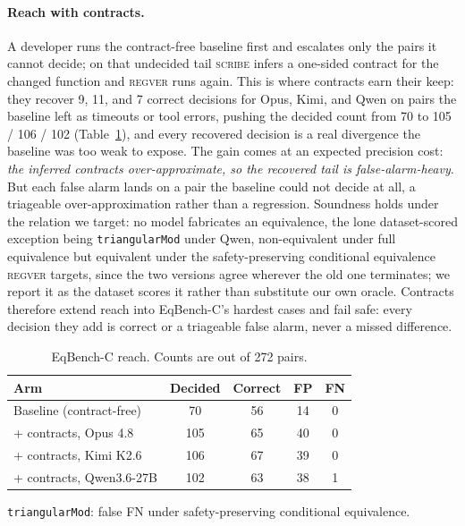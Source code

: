 \documentclass[conference]{IEEEtran}
\theoremstyle{definition}
\theoremstyle{remark}
\begin{document}
\paragraph{Reach with contracts.} A developer runs the contract-free
baseline first and escalates only the pairs it cannot decide; on that
undecided tail \textsc{scribe} infers a one-sided contract for the
changed function and \textsc{regver} runs again. This is where
contracts earn their keep: they recover 9, 11, and 7 correct decisions
for Opus, Kimi, and Qwen on pairs the baseline left as timeouts or
tool errors, pushing the decided count from 70 to 105 / 106 / 102
(Table~\ref{tab:eqbench-reach}), and every recovered decision is a
real divergence the baseline was too weak to expose. The gain comes
at an expected precision cost: \textit{the inferred contracts
over-approximate, so the recovered tail is false-alarm-heavy}. But
each false alarm lands on a pair the baseline could not decide at
all, a triageable over-approximation rather than a regression.
Soundness holds under the relation we target: no model fabricates an
equivalence, the lone dataset-scored exception being
\texttt{triangularMod} under Qwen, non-equivalent under full
equivalence but equivalent under the safety-preserving conditional
equivalence \textsc{regver} targets, since the two versions agree
wherever the old one terminates; we report it as the dataset scores
it rather than substitute our own oracle. Contracts therefore extend
reach into EqBench-C's hardest cases and fail safe: every decision
they add is correct or a triageable false alarm, never a missed difference.

\begin{table}[t]
  \centering
  \caption{EqBench-C reach. Counts are out of 272 pairs.}
  \label{tab:eqbench-reach}
  \begin{threeparttable}
    \begin{tabular}{lcccc}
      \toprule
      Arm & Decided & Correct & FP & FN \\
      \midrule
      Baseline (contract-free)  & 70  & 56 & 14 & 0 \\
      \midrule
      + contracts, Opus 4.8     & 105 & 65 & 40 & 0 \\
      + contracts, Kimi K2.6    & 106 & 67 & 39 & 0 \\
      + contracts, Qwen3.6-27B  & 102 & 63 & 38 & 1\tnote{a} \\
      \bottomrule
    \end{tabular}
    \begin{tablenotes}
      \footnotesize
    \item[a] \texttt{triangularMod}: false FN under safety-preserving
      conditional equivalence.
    \end{tablenotes}
  \end{threeparttable}
\end{table}
\end{document}

